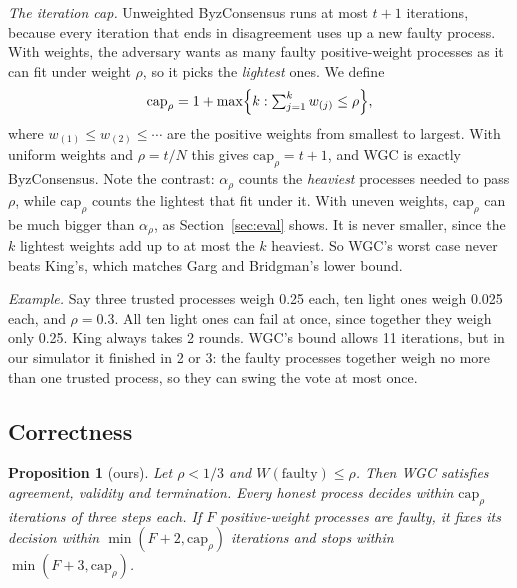\documentclass[conference]{IEEEtran}
\newtheorem{proposition}{Proposition}
\theoremstyle{definition}
\newcommand{\W}{W}
\newcommand{\capr}{\mathrm{cap}_\rho}
\begin{document}
\emph{The iteration cap.} Unweighted ByzConsensus runs at most $t+1$ iterations, because every iteration that ends in disagreement uses up a new faulty process. With weights, the adversary wants as many faulty positive-weight processes as it can fit under weight $\rho$, so it picks the \emph{lightest} ones. We define \[ \capr = 1+\max\Bigl\{k : \textstyle\sum_{j=1}^{k} w_{(j)}\le\rho\Bigr\}, \] where $w_{(1)}\le w_{(2)}\le\cdots$ are the positive weights from smallest to largest. With uniform weights and $\rho=t/N$ this gives $\capr=t+1$, and WGC is exactly ByzConsensus. Note the contrast: $\alpha_\rho$ counts the \emph{heaviest} processes needed to pass $\rho$, while $\capr$ counts the lightest that fit under it. With uneven weights, $\capr$ can be much bigger than $\alpha_\rho$, as Section~\ref{sec:eval} shows. It is never smaller, since the $k$ lightest weights add up to at most the $k$ heaviest. So WGC's worst case never beats King's, which matches Garg and Bridgman's lower bound.

\emph{Example.} Say three trusted processes weigh 0.25 each, ten light ones weigh 0.025 each, and $\rho=0.3$. All ten light ones can fail at once, since together they weigh only 0.25. King always takes 2 rounds. WGC's bound allows 11 iterations, but in our simulator it finished in 2 or 3: the faulty processes together weigh no more than one trusted process, so they can swing the vote at most once.

\subsection{Correctness}
\begin{proposition}[ours]\label{prop:wgc}
Let $\rho<1/3$ and $\W(\text{faulty})\le\rho$. Then WGC satisfies agreement, validity and termination. Every honest process decides within $\capr$ iterations of three steps each. If $F$ positive-weight processes are faulty, it fixes its decision within $\min(F+2,\capr)$ iterations and stops within $\min(F+3,\capr)$.
\end{proposition}
\end{document}
